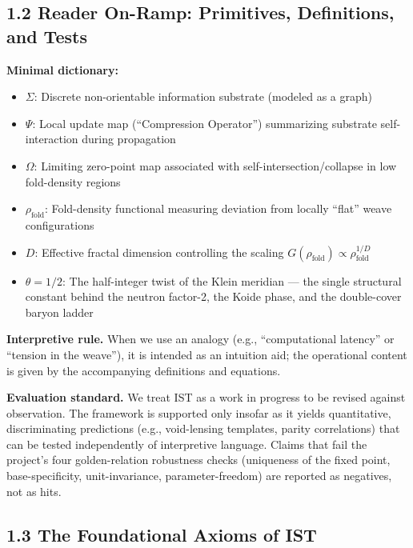 \documentclass[
  11pt,
]{article}
\providecommand{\tightlist}{%
  \setlength{\itemsep}{0pt}\setlength{\parskip}{0pt}}
\begin{document}
\subsection{1.2 Reader On-Ramp: Primitives, Definitions, and
Tests}\label{reader-on-ramp-primitives-definitions-and-tests}

\textbf{Minimal dictionary:}

\begin{itemize}
\tightlist
\item
  \textbf{\(\Sigma\)}: Discrete non-orientable information substrate
  (modeled as a graph)
\item
  \textbf{\(\Psi\)}: Local update map (``Compression Operator'')
  summarizing substrate self-interaction during propagation
\item
  \textbf{\(\Omega\)}: Limiting zero-point map associated with
  self-intersection/collapse in low fold-density regions
\item
  \textbf{\(\rho_{\text{fold}}\)}: Fold-density functional measuring
  deviation from locally ``flat'' weave configurations
\item
  \textbf{\(D\)}: Effective fractal dimension controlling the scaling
  \(G(\rho_{\text{fold}}) \propto \rho_{\text{fold}}^{1/D}\)
\item
  \textbf{\(\theta = 1/2\)}: The half-integer twist of the Klein
  meridian --- the single structural constant behind the neutron
  factor-2, the Koide phase, and the double-cover baryon ladder
\end{itemize}

\textbf{Interpretive rule.} When we use an analogy (e.g.,
``computational latency'' or ``tension in the weave''), it is intended
as an intuition aid; the operational content is given by the
accompanying definitions and equations.

\textbf{Evaluation standard.} We treat IST as a work in progress to be
revised against observation. The framework is supported only insofar as
it yields quantitative, discriminating predictions (e.g., void-lensing
templates, parity correlations) that can be tested independently of
interpretive language. Claims that fail the project's four
golden-relation robustness checks (uniqueness of the fixed point,
base-specificity, unit-invariance, parameter-freedom) are reported as
negatives, not as hits.

\subsection{1.3 The Foundational Axioms of
IST}\label{the-foundational-axioms-of-ist}
\end{document}
